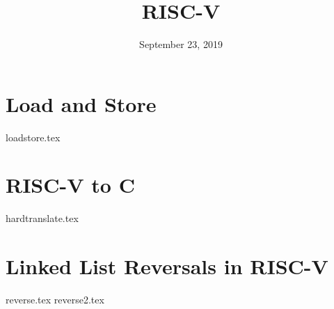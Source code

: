 \documentclass[11pt]{exam}
\title{RISC-V}
\date{September 23, 2019}
\begin{document}
\maketitle

\section{Load and Store}
\begin{questions}
{loadstore.tex}
\end{questions}
\newpage

\section{RISC-V to C}
\begin{questions}
{hardtranslate.tex}
\end{questions}
\newpage

\section{Linked List Reversals in RISC-V}
\begin{questions}
{reverse.tex}
{reverse2.tex}
\end{questions}
\newpage
\end{document}
